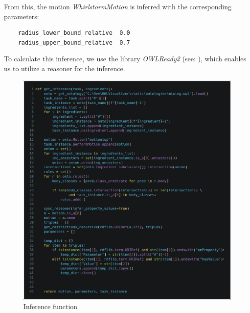 From this, the motion \textit{WhirlstormMotion} is inferred with the corresponding parameters:
\begin{lstlisting}
    radius_lower_bound_relative  0.0
    radius_upper_bound_relative  0.7
\end{lstlisting}
To calculate this inference, we use the library \textit{OWLReady2} (see: ), which enables us to utilize a reasoner for the inference.
\begin{figure}[H]
    \includegraphics[scale=0.23]{Graphics/get_inference.png}
    \caption{Inference function}
\end{figure}
